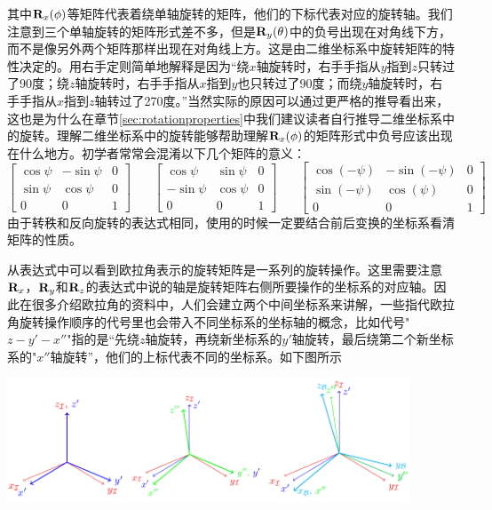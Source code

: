 \documentclass[11pt]{article}
\begin{document}
其中${\bf R}_x(\phi)$等矩阵代表着绕单轴旋转的矩阵，他们的下标代表对应的旋转轴。我们注意到三个单轴旋转的矩阵形式差不多，但是${\bf R}_y(\theta)$中的负号出现在对角线下方，而不是像另外两个矩阵那样出现在对角线上方。这是由二维坐标系中旋转矩阵的特性决定的。用右手定则简单地解释是因为“绕$x$轴旋转时，右手手指从$y$指到$z$只转过了90度；绕$z$轴旋转时，右手手指从$x$指到$y$也只转过了90度；而绕$y$轴旋转时，右手手指从$x$指到$z$轴转过了270度。”当然实际的原因可以通过更严格的推导看出来，这也是为什么在章节\ref{sec:rotationproperties}中我们建议读者自行推导二维坐标系中的旋转。理解二维坐标系中的旋转能够帮助理解${\bf R}_x(\phi)$的矩阵形式中负号应该出现在什么地方。初学者常常会混淆以下几个矩阵的意义：
$$
\begin{bmatrix}
\cos\psi & - \sin\psi & 0\\
\sin\psi & \cos\psi & 0\\
0 & 0 & 1
\end{bmatrix}
\ \ \ \  \ \ \ \
\begin{bmatrix}
\cos\psi & \sin\psi & 0\\
-\sin\psi & \cos\psi & 0\\
0 & 0 & 1
\end{bmatrix} 
\ \ \ \  \ \ \ \
\begin{bmatrix}
\cos(-\psi) & -\sin(-\psi) & 0\\
\sin(-\psi) & \cos(\psi) & 0\\
0 & 0 & 1
\end{bmatrix} 
$$
由于转秩和反向旋转的表达式相同，使用的时候一定要结合前后变换的坐标系看清矩阵的性质。

从表达式中可以看到欧拉角表示的旋转矩阵是一系列的旋转操作。这里需要注意${\bf R}_x$，${\bf R}_y$和${\bf R}_z$的表达式中说的轴是旋转矩阵右侧所要操作的坐标系的对应轴。因此在很多介绍欧拉角的资料中，人们会建立两个中间坐标系来讲解，一些指代欧拉角旋转操作顺序的代号里也会带入不同坐标系的坐标轴的概念，比如代号"$z-y'-x''$"指的是“先绕$z$轴旋转，再绕新坐标系的$y'$轴旋转，最后绕第二个新坐标系的"$x''$轴旋转”，他们的上标代表不同的坐标系。如下图所示

\begin{center}
\includegraphics[width=0.9\textwidth]{images/euler.png}
\end{center}
\end{document}
